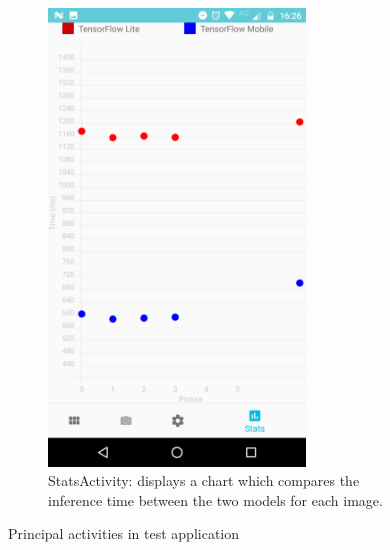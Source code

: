 \documentclass{article}
\begin{document}
\begin{figure}[]
\begin{subfigure}[p]{0.45\textwidth}
    \includegraphics[width=0.75\textwidth]{img/app/stats.png}
    \caption{\footnotesize StatsActivity: displays a chart which compares the inference time between the two models for each image.}
    \label{fig:StatsActivity}
  \end{subfigure}
  \caption {\footnotesize Principal activities in test application}
  \label{fig:Activities}
\end{figure}

\newpage
\end{document}
